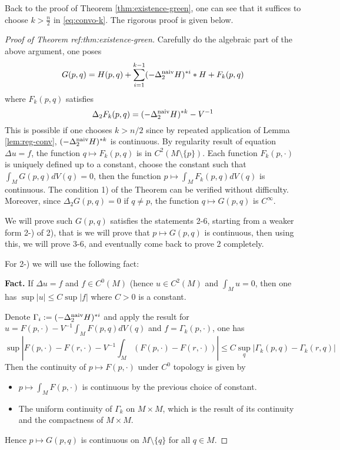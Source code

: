 Back to the proof of Theorem \ref{thm:existence-green}, one can see that it suffices to
choose \(k > \frac{n}{2}\) in \eqref{eq:convo-k}. The rigorous proof is given below.

\begin{proof}[Proof of Theorem ref:thm:existence-green]
Carefully do the algebraic part of the above argument, one poses
\[
 G(p,q) = H(p,q) + \sum_{i=1}^{k-1} (-\Delta_2^{\rm naiv}H)^{*i} * H + F_k(p,q)
\]
where \(F_k(p,q)\) satisfies
\[
 \Delta_2 F_k(p,q) = (-\Delta_2^{\rm naiv}H)^{*k} - V^{-1}
\]
This is possible if one chooses \(k>n/2\) since by repeated application of Lemma
\ref{lem:reg-conv}, \((-\Delta_2^{\rm naiv}H)^{*k}\) is continuous. By regularity result of
equation \(\Delta u = f\), the function \(q \mapsto F_k(p,q)\) is in
\(C^2(M\setminus \{ p\})\). Each function \(F_k(p,\cdot)\) is uniquely defined up to a
constant, choose the constant such that \(\int_M G(p,q) dV(q)=0\), then the function \(p \mapsto \int_M F_k(p,q) dV(q)\) is continuous. The condition 1) of the Theorem can be
verified without difficulty.
Moreover, since \(\Delta_2 G(p,q)=0\) if \(q\ne p\), the function \(q \mapsto G(p,q)\) is \(C^\infty\).

We will prove such \(G(p,q)\) satisfies the statements 2-6, starting from a weaker form 2-)
of 2), that is we will prove that \(p\mapsto G(p,q)\) is continuous, then using this, we
will prove 3-6, and eventually come back to prove 2 completely.

For 2-) we will use the following fact:

\textbf{Fact.} If \(\Delta u = f\) and \(f\in C^0(M)\) (hence \(u\in C^2(M)\) and
\(\int_M u = 0\), then one has \(\sup |u| \leq C \sup |f|\) where \(C>0\) is a constant.

Denote \(\Gamma_i:= (-\Delta_2^{\rm naiv} H)^{*i}\) and apply the result for
\(u= F(p,\cdot) - V^{-1}\int_M F(p,q) dV(q)\) and \(f=\Gamma_k(p,\cdot)\), one has
\[
 \sup \left|F(p,\cdot) - F(r,\cdot) - V^{-1}\int_M \left(F(p,\cdot)-F(r,\cdot)\right)\right| \leq C \sup_q |\Gamma_k(p,q)-\Gamma_k(r,q)|
\]
Then the continuity of \(p\mapsto F(p,\cdot)\) under \(C^0\) topology is given by
\begin{itemize}
\item \(p\mapsto \int_M F(p,\cdot)\) is continuous by the previous choice of constant.
\item The uniform continuity of \(\Gamma_k\) on \(M\times M\), which is the result of its
continuity and the compactness of \(M\times M\).
\end{itemize}
Hence \(p\mapsto G(p,q)\) is continuous on \(M\setminus \{ q\}\) for all \(q\in M\).


\end{proof}
